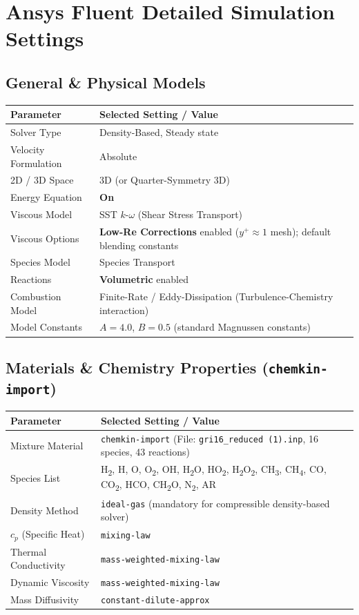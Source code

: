 \documentclass[11pt,a4paper]{article}
\begin{document}
\section{Ansys Fluent Detailed Simulation Settings}

\subsection{General \& Physical Models}
\begin{tabularx}{\textwidth}{L{4.5cm} Y}
\toprule
\textbf{Parameter} & \textbf{Selected Setting / Value} \\
\midrule
Solver Type & Density-Based, Steady state \\
Velocity Formulation & Absolute \\
2D / 3D Space & 3D (or Quarter-Symmetry 3D) \\
Energy Equation & \textbf{On} \\
Viscous Model & SST $k$-$\omega$ (Shear Stress Transport) \\
Viscous Options & \textbf{Low-Re Corrections} enabled ($y^+ \approx 1$ mesh); default blending constants \\
Species Model & Species Transport \\
Reactions & \textbf{Volumetric} enabled \\
Combustion Model & Finite-Rate / Eddy-Dissipation (Turbulence-Chemistry interaction) \\
Model Constants & $A = 4.0$, $B = 0.5$ (standard Magnussen constants) \\
\bottomrule
\end{tabularx}

\subsection{Materials \& Chemistry Properties (\texttt{chemkin-import})}
\begin{tabularx}{\textwidth}{L{4.5cm} Y}
\toprule
\textbf{Parameter} & \textbf{Selected Setting / Value} \\
\midrule
Mixture Material & \texttt{chemkin-import} (File: \texttt{gri16\_reduced (1).inp}, 16 species, 43 reactions) \\
Species List & H\textsubscript{2}, H, O, O\textsubscript{2}, OH, H\textsubscript{2}O, HO\textsubscript{2}, H\textsubscript{2}O\textsubscript{2}, CH\textsubscript{3}, CH\textsubscript{4}, CO, CO\textsubscript{2}, HCO, CH\textsubscript{2}O, N\textsubscript{2}, AR \\
Density Method & \texttt{ideal-gas} (mandatory for compressible density-based solver) \\
$c_p$ (Specific Heat) & \texttt{mixing-law} \\
Thermal Conductivity & \texttt{mass-weighted-mixing-law} \\
Dynamic Viscosity & \texttt{mass-weighted-mixing-law} \\
Mass Diffusivity & \texttt{constant-dilute-approx} \\
\bottomrule
\end{tabularx}
\end{document}
